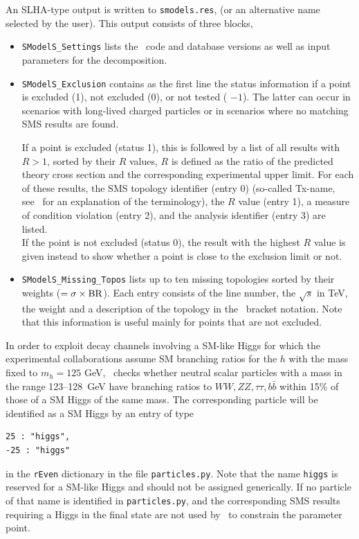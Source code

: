 \documentclass[12pt,a4paper]{article}
\begin{document}
{An SLHA-type output  is written to {\tt smodels.res},
(or an alternative name selected by the user).
This output consists of three blocks, 
\begin{itemize}
\item {\tt SModelS\_Settings} lists the \smodels\ code and database versions as well as input parameters for the decomposition. 
\item {\tt SModelS\_Exclusion} 
contains as the first line the status information if a point is excluded (1), not excluded (0),  or not tested ( $-1$). 
The latter can occur in scenarios with long-lived charged particles or in scenarios where no matching SMS results are found. 

If a point is excluded (status 1), this is followed by a list of all results with $R>1$, sorted by their $R$ values,  $R$ is defined as the ratio of the predicted theory cross section and the corresponding experimental upper limit.
For each of these results, the SMS topology identifier (entry 0) (so-called Tx-name, see~\cite{SMS_dictionary} for an explanation of the terminology), 
the $R$ value (entry 1), a measure of condition violation (entry 2), and the analysis identifier (entry 3) are listed.\\
If the point is not excluded (status 0), the result with the highest $R$ value is given instead to show whether a point is close to the exclusion limit or not. 


\item {\tt SModelS\_Missing\_Topos} lists up to ten missing topologies sorted by their weights ($ = \sigma\times {\rm BR}$).  Each entry consists of the line number, the $\sqrt{s}$ in TeV, the weight and a description of the topology in the \smodels\ bracket notation. Note that this information is useful mainly for points that are not excluded.

\end{itemize}
  

In order to  exploit decay channels involving a SM-like Higgs for which the experimental collaborations assume  
SM branching ratios for the $h$ with the mass fixed to $m_h=125$ GeV, \micro\ checks whether  
neutral scalar particles with a mass in the range 123--128~GeV have branching ratios to $WW,ZZ,\tau\tau, b\bar{b}$ within 15\% of those of a SM Higgs of the same mass. 
The corresponding particle will be identified as a SM Higgs 
by an entry of type
\begin{verbatim}
25 : "higgs",
-25 : "higgs"
\end{verbatim}
in the {\tt rEven} dictionary in the file {\tt particles.py}.    
Note that the name {\tt higgs} is reserved for a SM-like Higgs and should not be assigned generically. 
If no particle of that name is identified in {\tt particles.py},  and the corresponding SMS results requiring a Higgs in the final state are not used by \smodels\ to constrain the parameter point.

}
\end{document}
